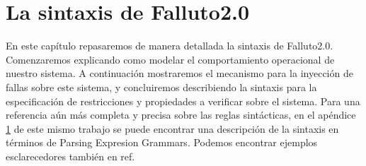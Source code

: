 \documentclass[titlepage, 12pt]{book}
\begin{document}


\chapter{La sintaxis de Falluto2.0}

En este cap\'itulo repasaremos de manera detallada la sintaxis de Falluto2.0. Comenzaremos explicando como modelar el comportamiento operacional de nuestro sistema. A continuaci\'on mostraremos el mecanismo para la inyecci\'on de fallas sobre este sistema, y concluiremos describiendo la sintaxis para la especificaci\'on de restricciones y propiedades a verificar sobre el sistema. Para una referencia a\'un m\'as completa y precisa sobre las reglas sint\'acticas, en el ap\'endice \ref{} de este mismo trabajo se puede encontrar una descripci\'on de la sintaxis en t\'erminos de Parsing Expresion Grammars. Podemos encontrar ejemplos esclarecedores también en ref{}.
\end{document}
